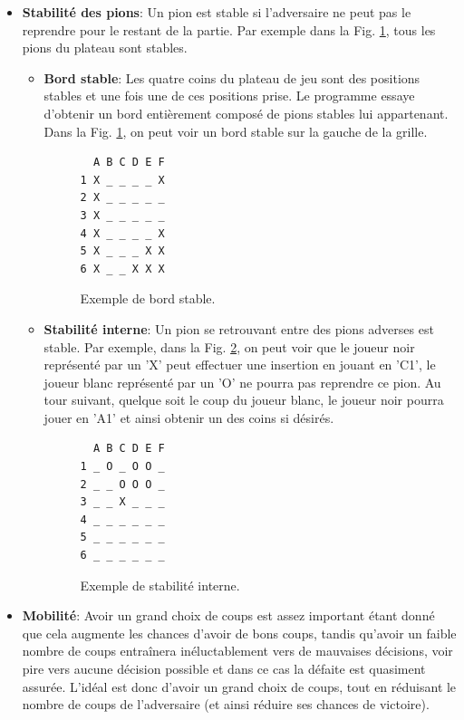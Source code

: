\documentclass[10pt,a4paper]{article}
\begin{document}
\begin{itemize}
\item \textbf{Stabilité des pions}: Un pion est stable si l'adversaire ne peut pas le reprendre pour le restant de la partie. Par exemple dans la Fig. \ref{fig:bord_stable}, tous les pions du plateau sont stables.\\

\begin{itemize}
\item \textbf{Bord stable}: Les quatre coins du plateau de jeu sont des positions stables et une fois une de ces positions prise. Le programme essaye d'obtenir un bord entièrement composé de pions stables lui appartenant. Dans la Fig. \ref{fig:bord_stable}, on peut voir un bord stable sur la gauche de la grille.

\begin{figure}[H]    
\centering
\begin{BVerbatim}
  A B C D E F
1 X _ _ _ _ X
2 X _ _ _ _ _
3 X _ _ _ _ _
4 X _ _ _ _ X
5 X _ _ _ X X
6 X _ _ X X X
\end{BVerbatim}
\caption{Exemple de bord stable.\label{fig:bord_stable}}
\end{figure}

\item \textbf{Stabilité interne}: Un pion se retrouvant entre des pions adverses est stable. Par exemple, dans la Fig. \ref{fig:stabilité_interne}, on peut voir que le joueur noir représenté par un 'X' peut effectuer une insertion en jouant en 'C1', le joueur blanc représenté par un 'O' ne pourra pas reprendre ce pion. Au tour suivant, quelque soit le coup du joueur blanc, le joueur noir pourra jouer en 'A1' et ainsi obtenir un des coins si désirés.

\begin{figure}[H]    
\centering
\begin{BVerbatim}
  A B C D E F
1 _ O _ O O _
2 _ _ O O O _
3 _ _ X _ _ _
4 _ _ _ _ _ _
5 _ _ _ _ _ _
6 _ _ _ _ _ _
\end{BVerbatim}
\caption{Exemple de stabilité interne.\label{fig:stabilité_interne}}
\end{figure}
\end{itemize}

\item \textbf{Mobilité}: Avoir un grand choix de coups est assez important étant donné que cela augmente les chances d'avoir de bons coups, tandis qu'avoir un faible nombre de coups entraînera inéluctablement vers de mauvaises décisions, voir pire vers aucune décision possible et dans ce cas la défaite est quasiment assurée. L'idéal est donc d'avoir un grand choix de coups, tout en réduisant le nombre de coups de l'adversaire (et ainsi réduire ses chances de victoire).\\


\end{itemize}
\end{document}
